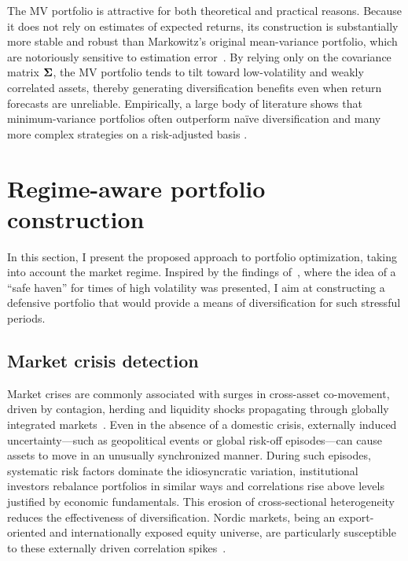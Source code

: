 \documentclass[pdflatex,sn-basic]{sn-jnl}%
\theoremstyle{thmstyleone}%
\theoremstyle{thmstyletwo}%
\theoremstyle{thmstylethree}%
\begin{document}
The MV portfolio is attractive for both theoretical and practical reasons. Because it does not rely on estimates of expected returns, its construction is substantially more stable and robust than Markowitz's original mean-variance portfolio, which are notoriously sensitive to estimation error~\citep{merton1980estimating}. By relying only on the covariance matrix $\boldsymbol{\Sigma}$, the MV portfolio tends to tilt toward low-volatility and weakly correlated assets, thereby generating diversification benefits even when return forecasts are unreliable. Empirically, a large body of literature shows that minimum-variance portfolios often outperform na\"{i}ve diversification and many more complex strategies on a risk-adjusted basis \citep[see, e.g.,][]{jagannathan2003risk,clarke2006minimum}.

\section{Regime-aware portfolio construction}
\label{sec:portfolio_construction}
In this section, I present the proposed approach to portfolio optimization, taking into account the market regime. Inspired by the findings of~\cite{molero2025random}, where the idea of a ``safe haven'' for times of high volatility was presented, I aim at constructing a defensive portfolio that would provide a means of diversification for such stressful periods. 

\subsection{Market crisis detection}
\label{sec:crisis_detection}
Market crises are commonly associated with surges in cross-asset co-movement, driven by contagion, herding and liquidity shocks propagating through globally integrated markets~\citep{bekaert2003market, chiang2007dynamic}. Even in the absence of a domestic crisis, externally induced uncertainty---such as geopolitical events or global risk-off episodes---can cause assets to move in an unusually synchronized manner. During such episodes, systematic risk factors dominate the idiosyncratic variation, institutional investors rebalance portfolios in similar ways and correlations rise above levels justified by economic fundamentals. This erosion of cross-sectional heterogeneity reduces the effectiveness of diversification. Nordic markets, being an export-oriented and internationally exposed equity universe, are particularly susceptible to these externally driven correlation spikes~\citep{fjaervik2023crash}.
\end{document}
